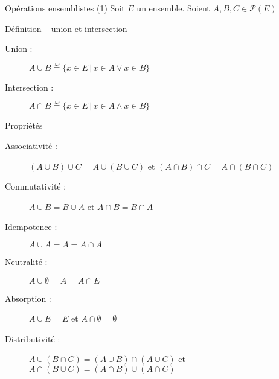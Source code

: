 
\begingroup

\begin{frame}{Opérations ensemblistes (1)}
  Soit $E$ un ensemble. Soient $A, B, C \in \mathscr{P}(E)$
  \begin{block}{Définition -- union et intersection}
    \begin{description}
    \item[Union :] $A \cup B \eqdef \{x \in E \,|\, x \in A \lor x \in B\}$
    \item[Intersection :] $A \cap B \eqdef \{x \in E \,|\, x \in A \land x \in B\}$
    \end{description}
  \end{block}
  \begin{block}{Propriétés}
    \begin{description}
    \item[Associativité :] \alert{$(A \cup B) \cup C = A \cup (B \cup C)$} et \alert{$(A \cap B) \cap C = A \cap (B \cap C)$}
    \item[Commutativité :] \alert{$A \cup B = B \cup A$} et \alert{$A \cap B = B \cap A$}
    \item[Idempotence :] \alert{$A \cup A = A = A \cap A$}
    \item[Neutralité :] \alert{$A \cup \emptyset = A = A \cap E$}
    \item[Absorption :] \alert{$A \cup E = E$} et \alert{$A \cap \emptyset = \emptyset$}
    \item[Distributivité :] \alert{$A \cup (B \cap C) = (A \cup B) \cap (A \cup C)$} et \alert{$A \cap (B \cup C) = (A \cap B) \cup (A \cap C)$}
    \end{description}
  \end{block}

\end{frame}

\endgroup
